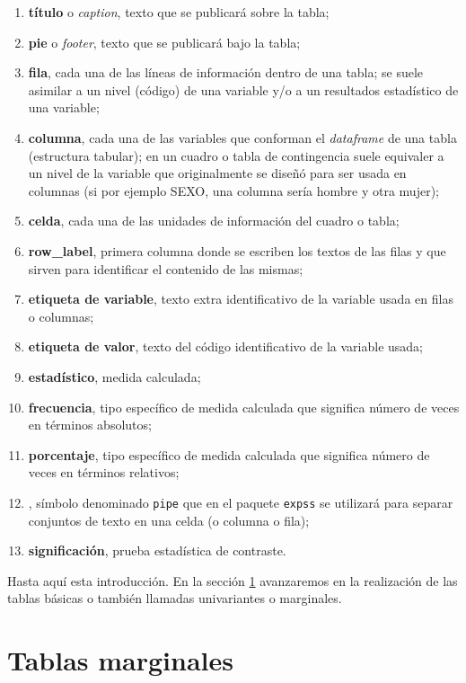 \documentclass[
]{book}
\providecommand{\tightlist}{%
  \setlength{\itemsep}{0pt}\setlength{\parskip}{0pt}}
\begin{document}
\begin{enumerate}
\def\labelenumi{\arabic{enumi}.}
\tightlist
\item
  \textbf{título} o \emph{caption}, texto que se publicará sobre la tabla;
\item
  \textbf{pie} o \emph{footer}, texto que se publicará bajo la tabla;
\item
  \textbf{fila}, cada una de las líneas de información dentro de una tabla; se suele asimilar a un nivel (código) de una variable y/o a un resultados estadístico de una variable;
\item
  \textbf{columna}, cada una de las variables que conforman el \emph{dataframe} de una tabla (estructura tabular); en un cuadro o tabla de contingencia suele equivaler a un nivel de la variable que originalmente se diseñó para ser usada en columnas (si por ejemplo SEXO, una columna sería hombre y otra mujer);
\item
  \textbf{celda}, cada una de las unidades de información del cuadro o tabla;
\item
  \textbf{row\_label}, primera columna donde se escriben los textos de las filas y que sirven para identificar el contenido de las mismas;
\item
  \textbf{etiqueta de variable}, texto extra identificativo de la variable usada en filas o columnas;
\item
  \textbf{etiqueta de valor}, texto del código identificativo de la variable usada;
\item
  \textbf{estadístico}, medida calculada;
\item
  \textbf{frecuencia}, tipo específico de medida calculada que significa número de veces en términos absolutos;
\item
  \textbf{porcentaje}, tipo específico de medida calculada que significa número de veces en términos relativos;
\item
  \textbf{\texttt{\textbar{}}}, símbolo denominado \texttt{pipe} que en el paquete \texttt{expss} se utilizará para separar conjuntos de texto en una celda (o columna o fila);
\item
  \textbf{significación}, prueba estadística de contraste.
\end{enumerate}

Hasta aquí esta introducción. En la sección \ref{tse03} avanzaremos en la realización de las tablas básicas o también llamadas univariantes o marginales.

\hypertarget{tse03}{%
\chapter{Tablas marginales}\label{tse03}}
\end{document}
